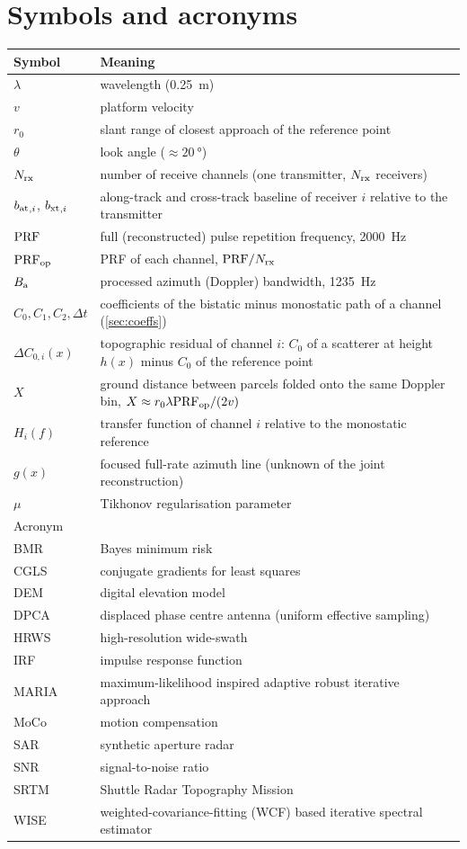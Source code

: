 \chapter*{Symbols and acronyms}

\begin{tabularx}{\linewidth}{@{}l X@{}}
\toprule
Symbol & Meaning \\
\midrule
$\lambda$ & wavelength (\SI{0.25}{m}) \\
$v$ & platform velocity \\
$r_0$ & slant range of closest approach of the reference point \\
$\theta$ & look angle ($\approx\SI{20}{\degree}$) \\
${N_{\mathrm{rx}}}$ & number of receive channels (one transmitter, ${N_{\mathrm{rx}}}$ receivers) \\
${b_{\mathrm{at}}}_{,i}$, ${b_{\mathrm{xt}}}_{,i}$ & along-track and cross-track baseline of receiver $i$ relative to the transmitter \\
$\mathrm{PRF}$ & full (reconstructed) pulse repetition frequency, \SI{2000}{Hz} \\
$\mathrm{PRF}_{\mathrm{op}}$ & PRF of each channel, $\mathrm{PRF}/{N_{\mathrm{rx}}}$ \\
$B_{\mathrm{a}}$ & processed azimuth (Doppler) bandwidth, \SI{1235}{Hz} \\
$C_0, C_1, C_2, \Delta t$ & coefficients of the bistatic minus monostatic path of a channel (\cref{sec:coeffs}) \\
$\Delta C_{0,i}(x)$ & topographic residual of channel $i$: $C_0$ of a scatterer at height $h(x)$ minus $C_0$ of the reference point \\
$X$ & ground distance between parcels folded onto the same Doppler bin, $X\approx r_0\lambda\mathrm{PRF}_{\mathrm{op}}/(2v)$ \\
$H_i(f)$ & transfer function of channel $i$ relative to the monostatic reference \\
$g(x)$ & focused full-rate azimuth line (unknown of the joint reconstruction) \\
$\mu$ & Tikhonov regularisation parameter \\
\midrule
Acronym & \\
\midrule
BMR & Bayes minimum risk \\
CGLS & conjugate gradients for least squares \\
DEM & digital elevation model \\
DPCA & displaced phase centre antenna (uniform effective sampling) \\
HRWS & high-resolution wide-swath \\
IRF & impulse response function \\
MARIA & maximum-likelihood inspired adaptive robust iterative approach \\
MoCo & motion compensation \\
SAR & synthetic aperture radar \\
SNR & signal-to-noise ratio \\
SRTM & Shuttle Radar Topography Mission \\
WISE & weighted-covariance-fitting (WCF) based iterative spectral estimator \\
\bottomrule
\end{tabularx}

